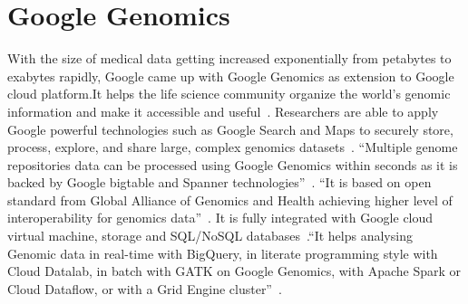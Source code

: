 \section{Google Genomics}

With the size of medical data getting increased exponentially from 
petabytes to exabytes rapidly, Google came up with Google Genomics 
as extension to Google cloud platform.It helps the life science 
community organize the world’s genomic information and make it 
accessible and useful~\cite{hid-sp18-523-www-genomics}. 
Researchers are able to apply Google powerful technologies such as 
Google Search and Maps to securely store, process, explore, and share 
large, complex genomics datasets~\cite{hid-sp18-523-www-genomics}.
``Multiple genome repositories data can be processed using Google 
Genomics within seconds as it is backed by Google bigtable and 
Spanner technologies''~\cite{hid-sp18-523-www-genomics}. 
``It is based on open standard from Global Alliance of Genomics and 
Health achieving higher level of interoperability for genomics 
data''~\cite{hid-sp18-523-www-genomics}. It is fully integrated with 
Google cloud virtual machine, storage and SQL/NoSQL 
databases~\cite{hid-sp18-523-www-genomics}.``It helps analysing Genomic 
data in real-time with BigQuery, in literate programming style 
with Cloud Datalab, in batch with GATK on Google Genomics, with 
Apache Spark or Cloud Dataflow, or with a Grid Engine 
cluster''~\cite{hid-sp18-523-www-genomics}.
